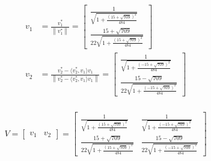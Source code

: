 \documentclass[a4paper, spanish]{article}
\newcommand{\norm}[1]{\left\lVert#1\right\rVert}
\begin{document}
    \begin{align}
      v_1 &= \frac{v_1^*}{\norm{v_1^*}} =
      \begin{bmatrix}
        \frac{1}{\sqrt{1 + \frac{(15 + \sqrt{709})^2}{484}}} \\
        \frac{15 + \sqrt{709}}{22\sqrt{1 + \frac{(15 + \sqrt{709})^2}{484}}}
      \end{bmatrix} \\
      v_2 &= \frac{v_2^* - \langle v_2^*,v_1 \rangle v_1}{\norm{v_2^* - \langle v_2^*,v_1 \rangle v_1}} =
      \begin{bmatrix}
        \frac{1}{\sqrt{1 + \frac{(- 15 + \sqrt{709})^2}{484}}} \\
        \frac{15 - \sqrt{709}}{22\sqrt{1 + \frac{(- 15 + \sqrt{709})^2}{484}}}
      \end{bmatrix} \\
    \end{align}


    \begin{align}
      V =
      \begin{bmatrix}
        v_1 & v_2
      \end{bmatrix} =
      \begin{bmatrix}
        \frac{1}{\sqrt{1 + \frac{(15 + \sqrt{709})^2}{484}}} & \frac{1}{\sqrt{1 + \frac{(- 15 + \sqrt{709})^2}{484}}}  \\
        \frac{15 + \sqrt{709}}{22\sqrt{1 + \frac{(15 + \sqrt{709})^2}{484}}} & \frac{15 - \sqrt{709}}{22\sqrt{1 + \frac{(- 15 + \sqrt{709})^2}{484}}}
      \end{bmatrix}
    \end{align}
\end{document}
